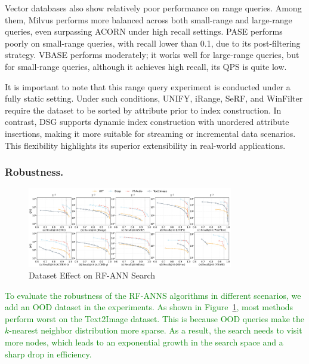 \documentclass[sigconf, nonacm]{acmart}
\begin{document}
	Vector databases also show relatively poor performance on range queries. Among them, Milvus performs more balanced across both small-range and large-range queries, even surpassing ACORN under high recall settings. PASE performs poorly on small-range queries, with recall lower than 0.1, due to its post-filtering strategy. 
	VBASE performs moderately; it works well for large-range queries, but for small-range queries, although it achieves high recall, its QPS is quite  low.
	
	
	
	It is important to note that this range query experiment is conducted under a fully static setting. Under such conditions, UNIFY, iRange, SeRF, and WinFilter require the dataset to be sorted by attribute prior to index construction. In contrast, DSG  supports dynamic index construction with unordered attribute insertions, making it more suitable for streaming or incremental data scenarios. This flexibility highlights its superior extensibility in real-world applications.
	\subsubsection{Robustness.}
	
	
	\begin{figure}[htbp]
		\centering
		\includegraphics[width=0.80\textwidth]{figures/exp/exp_8_3.pdf}
		\caption{Dataset Effect on RF-ANN Search}
		\label{fig:exp_8_3}
	\end{figure}
	
	\textcolor{green}{To evaluate the robustness of the RF-ANNS algorithms in different scenarios, we add an OOD dataset in the experiments. As shown in Figure~\ref{fig:exp_8_3}, most methods perform worst on the Text2Image dataset. This is because OOD queries make the $k$-nearest neighbor distribution more sparse. As a result, the search needs to visit more nodes, which leads to an exponential growth in the search space and a sharp drop in efficiency.}
	
\end{document}
